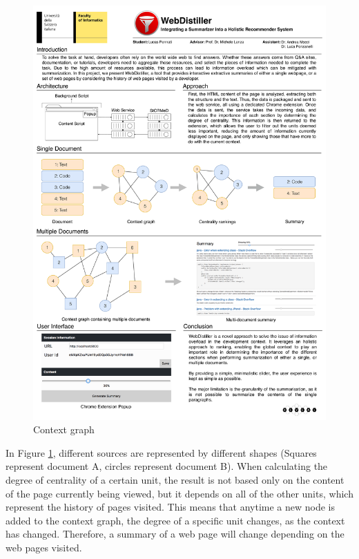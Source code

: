 \begin{figure}[H]
\centering
\includegraphics[scale=0.2]{Figures/mdGraphs}
\caption{Context graph}
\label{fig:multipleDocumentGraph}
\end{figure} 

In Figure \ref{fig:multipleDocumentGraph}, different sources are represented by different shapes (Squares represent document A, circles represent document B). When calculating the degree of centrality of a certain unit, the result is not based only on the content of the page currently being viewed, but it depends on all of the other units, which represent the history of pages visited. This means that anytime a new node is added to the context graph, the degree of a specific unit changes, as the context has changed. Therefore, a summary of a web page will change depending on the web pages visited.

